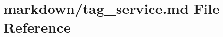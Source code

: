 \hypertarget{tag__service_8md}{}\section{markdown/tag\+\_\+service.md File Reference}
\label{tag__service_8md}
